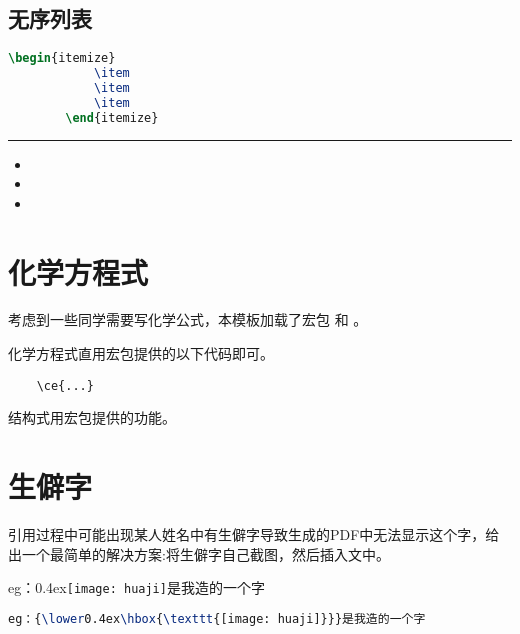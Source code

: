 \subsection{无序列表}
\begin{minipage}[t]{0.48\textwidth}
	\begin{lstlisting}[language=TeX]
		\begin{itemize}
			\item 
			\item 
			\item 
		\end{itemize}
	\end{lstlisting} 
\end{minipage}
\begin{minipage}[t]{0.48\textwidth}
	\rule[-10pt]{10cm}{0em}
	\begin{itemize}
		\item 
		\item 
		\item 
	\end{itemize}
\end{minipage}

\section{化学方程式}
考虑到一些同学需要写化学公式，本模板加载了宏包   和 。 

化学方程式直用宏包提供的以下代码即可。
\begin{lstlisting}
	\ce{...}
\end{lstlisting} 
\begin{center}
\end{center}
结构式用宏包提供的功能。
\begin{center}
\end{center}

\section{生僻字}
引用过程中可能出现某人姓名中有生僻字导致生成的PDF中无法显示这个字，给出一个最简单的解决方案:将生僻字自己截图，然后插入文中。

eg：{\lower0.4ex\hbox{\texttt{[image: huaji]}}}是我造的一个字
\begin{lstlisting}[language=TeX]
	eg：{\lower0.4ex\hbox{\texttt{[image: huaji]}}}是我造的一个字
\end{lstlisting}